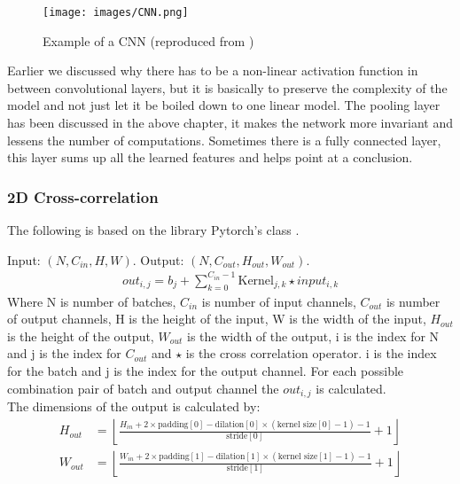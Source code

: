 \documentclass[a4paper,12pt]{article}
\begin{document}
\begin{figure}[H]
  \centering
  \texttt{[image: images/CNN.png]}
  \caption{Example of a CNN (reproduced from \cite{bishop2024deeplearning})} %
  \label{fig:n8}
\end{figure}
Earlier we discussed why there has to be a non-linear activation function in between convolutional layers, but it is basically to preserve the complexity of the model and not just let it be boiled down to one linear model.
The pooling layer has been discussed in the above chapter, it makes the network more invariant and lessens the number of computations. Sometimes there is a fully connected layer, this layer sums up all the learned features and helps point at a conclusion.
\subsubsection{2D Cross-correlation}
The following is based on the library Pytorch's class \cite{pytorch_conv2d}.

Input: $(N, C_{in}, H, W)$. Output: $(N, C_{out}, H_{out}, W_{out})$.
\begin{align}
    out_{i, j} = b_{j}+\sum^{C_{in}-1}_{k=0} \text{Kernel}_{j, k} \star input_{i, k}
\end{align}
Where N is number of batches, $C_{in}$ is number of input channels, $C_{out}$ is number of output channels, H is the height of the input, W is the width of the input, $H_{out}$ is the height of the output, $W_{out}$ is the width of the output, i is the index for N and j is the index for $C_{out}$ and $\star$ is the cross correlation operator. i is the index for the batch and j is the index for the output channel. For each possible combination pair of batch and output channel the $out_{i, j}$ is calculated.\\ 
The dimensions of the output is calculated by:
\begin{align}
    H_{out}&=\left\lfloor\frac{H_{in}+2\times\mathrm{padding}[0]-\mathrm{dilation}[0]\times(\text{kernel size}[0]-1)-1}{\mathrm{stride}[0]}+1\right\rfloor\\
    W_{out}&=\left\lfloor\frac{W_{in}+2\times\mathrm{padding}[1]-\mathrm{dilation}[1]\times(\text{kernel size}[1]-1)-1}{\mathrm{stride}[1]}+1\right\rfloor
\end{align}
\end{document}
